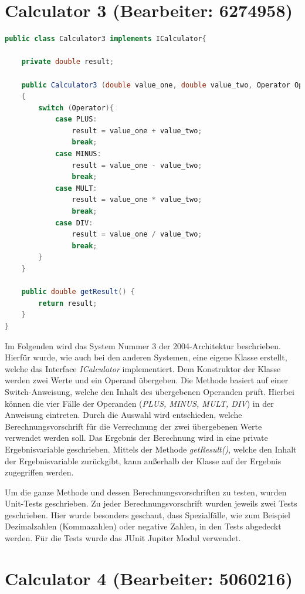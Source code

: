 \chapter{Calculator 3 (Bearbeiter: 6274958)}

\begin{lstlisting}[language=Java,basicstyle=\scriptsize, caption= Calculator 3]
public class Calculator3 implements ICalculator{

    private double result;

    public Calculator3 (double value_one, double value_two, Operator Operator)
    {
        switch (Operator){
            case PLUS:
                result = value_one + value_two;
                break;
            case MINUS:
                result = value_one - value_two;
                break;
            case MULT:
                result = value_one * value_two;
                break;
            case DIV:
                result = value_one / value_two;
                break;
        }
    }

    public double getResult() {
        return result;
    }
}
\end{lstlisting}

Im Folgenden wird das System Nummer 3 der 2004-Architektur beschrieben. Hierfür wurde, wie auch bei den anderen Systemen, eine eigene Klasse erstellt, welche das Interface \textit{ICalculator} implementiert. Dem Konstruktor der Klasse werden zwei Werte und ein Operand übergeben. Die Methode basiert auf einer Switch-Anweisung, welche den Inhalt des übergebenen Operanden prüft. Hierbei können die vier Fälle der Operanden (\textit{PLUS, MINUS, MULT, DIV}) in der Anweisung eintreten. Durch die Auswahl wird entschieden, welche Berechnungsvorschrift für die Verrechnung der zwei übergebenen Werte verwendet werden soll.  Das Ergebnis der Berechnung wird in eine private Ergebnisvariable geschrieben. Mittels der Methode \textit{getResult()}, welche den Inhalt der Ergebnisvariable zurückgibt, kann außerhalb der Klasse auf der Ergebnis zugegriffen werden. 


Um die ganze Methode und dessen Berechnungsvorschriften zu testen, wurden Unit-Tests geschrieben. Zu jeder Berechnungsvorschrift wurden jeweils zwei Tests geschrieben. Hier wurde besonders geschaut, dass Spezialfälle, wie zum Beispiel Dezimalzahlen (Kommazahlen) oder negative Zahlen, in den Tests abgedeckt werden. Für die Tests wurde das JUnit Jupiter Modul verwendet.


\chapter{Calculator 4 (Bearbeiter: 5060216)}

